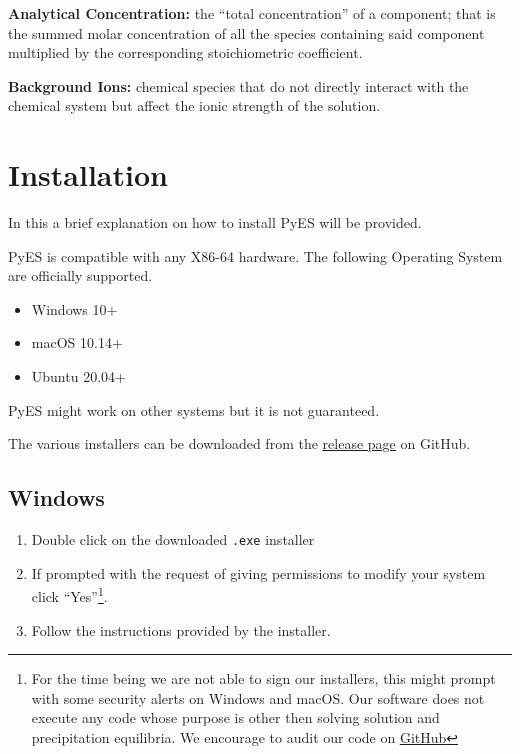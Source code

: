 \documentclass[a4paper, 12pt]{article}
\begin{document}
\textbf{Analytical Concentration:} the ``total concentration'' of a component; that is the summed molar concentration of all the species containing said component multiplied by the corresponding stoichiometric coefficient. 

\textbf{Background Ions:} chemical species that do not directly interact with the chemical system but affect the ionic strength of the solution.

\newpage

\section{Installation}
\label{sec:installation}
In this a brief explanation on how to install PyES will be provided.

PyES is compatible with any X86-64 hardware.
The following Operating System are officially supported.
\begin{itemize}[\textbullet]
    \item Windows 10+
    \item macOS 10.14+ 
    \item Ubuntu 20.04+

\end{itemize}

PyES might work on other systems but it is not guaranteed.

The various installers can be downloaded from the \href{https://github.com/Kastakin/PyES/releases/latest}{\underline{release page}} on GitHub.


\subsection{Windows}
\begin{enumerate}
    \item Double click on the downloaded \verb|.exe| installer
    \item If prompted with the request of giving permissions to modify your system click ``Yes''\footnote{\label{note1}For the time being we are not able to sign our installers, this might prompt with some security alerts on Windows and macOS. Our software does not execute any code whose purpose is other then solving solution and precipitation equilibria. We encourage to audit our code on \href{https://github.com/Kastakin/PyES}{\underline{GitHub}}}.
    \item Follow the instructions provided by the installer.
\end{enumerate}
\end{document}
